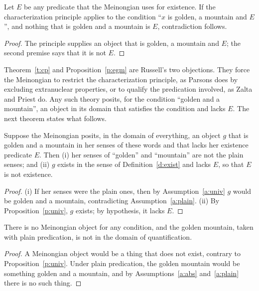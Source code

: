 \documentclass{situationist-preprint}
\begin{document}
\begin{proposition}\label{p:egm}
Let $E$ be any predicate that the Meinongian uses for existence. If the characterization principle applies to the condition \enquote{$x$ is golden, a mountain and $E$}, and nothing that is golden and a mountain is $E$, contradiction follows.
\end{proposition}

\begin{proof}
The principle supplies an object that is golden, a mountain and $E$; the second premise says that it is not $E$.
\end{proof}

Theorem~\ref{t:cp} and Proposition~\ref{p:egm} are Russell's two objections. They force the Meinongian to restrict the characterization principle, as Parsons does by excluding extranuclear properties, or to qualify the predication involved, as Zalta and Priest do. Any such theory posits, for the condition \enquote{golden and a mountain}, an object in its domain that satisfies the condition and lacks $E$. The next theorem states what follows.

\begin{theorem}\label{t:dilemma}
Suppose the Meinongian posits, in the domain of everything, an object $g$ that is golden and a mountain in her senses of these words and that lacks her existence predicate $E$. Then (i) her senses of \enquote{golden} and \enquote{mountain} are not the plain senses; and (ii) $g$ exists in the sense of Definition~\ref{d:exist} and lacks $E$, so that $E$ is not existence.
\end{theorem}

\begin{proof}
(i) If her senses were the plain ones, then by Assumption~\ref{a:univ} $g$ would be golden and a mountain, contradicting Assumption~\ref{a:plain}. (ii) By Proposition~\ref{p:univ}, $g$ exists; by hypothesis, it lacks $E$.
\end{proof}

\begin{corollary}\label{c:main}
There is no Meinongian object for any condition, and the golden mountain, taken with plain predication, is not in the domain of quantification.
\end{corollary}

\begin{proof}
A Meinongian object would be a thing that does not exist, contrary to Proposition~\ref{p:univ}. Under plain predication, the golden mountain would be something golden and a mountain, and by Assumptions~\ref{a:abs} and~\ref{a:plain} there is no such thing.
\end{proof}
\end{document}

